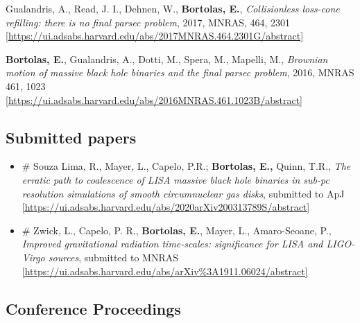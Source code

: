 \begin{etaremune}
\item Gualandris, A., Read, J. I., Dehnen, W., {\bf Bortolas, E.}, {\it Collisionless loss-cone refilling: there is no final parsec problem}, 2017, MNRAS, 464, 2301 
\\ \href{https://ui.adsabs.harvard.edu/abs/2017MNRAS.464.2301G/abstract}{\scriptsize [https://ui.adsabs.harvard.edu/abs/2017MNRAS.464.2301G/abstract]}


\item {\bf Bortolas, E.}, Gualandris, A., Dotti, M., Spera, M., Mapelli, M., {\it Brownian motion of massive black hole binaries and the final parsec problem}, 2016, MNRAS 461, 1023 \\ \href{https://ui.adsabs.harvard.edu/abs/2016MNRAS.461.1023B/abstract}{\scriptsize [https://ui.adsabs.harvard.edu/abs/2016MNRAS.461.1023B/abstract]}


\end{etaremune}

\subsection*{ Submitted papers }

\begin{itemize}
\setlength\itemsep{-1pt}




\item  \# Souza Lima, R., Mayer, L., Capelo, P.R.; \textbf{Bortolas, E.,} Quinn, T.R., { \it The erratic path to coalescence of LISA massive black hole binaries in sub-pc resolution simulations of smooth circumnuclear gas disks}, submitted to ApJ \\ \href{https://ui.adsabs.harvard.edu/abs/2020arXiv200313789S/abstract}{\scriptsize [https://ui.adsabs.harvard.edu/abs/2020arXiv200313789S/abstract]}


\item  \# Zwick, L., Capelo, P. R., \textbf{Bortolas, E.}, Mayer, L., Amaro-Seoane, P., { \it Improved gravitational radiation time-scales: significance for LISA and LIGO-Virgo sources}, submitted to MNRAS \\ \href{https://ui.adsabs.harvard.edu/abs/arXiv\%3A1911.06024/abstract}{\scriptsize [https://ui.adsabs.harvard.edu/abs/arXiv\%3A1911.06024/abstract]}
\end{itemize}


\subsection*{Conference Proceedings }




